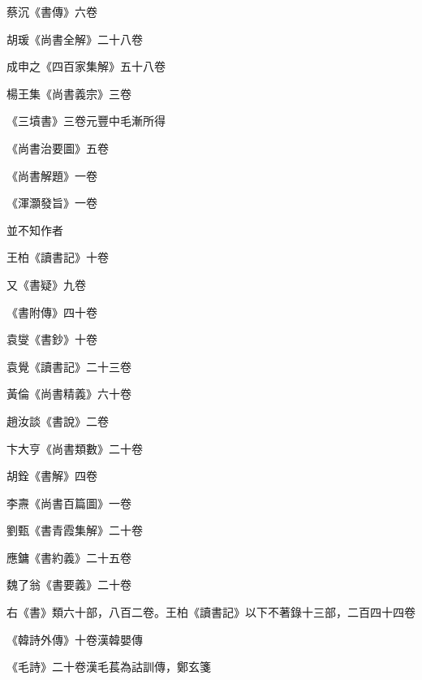 \begin{pinyinscope}
 蔡沉《書傳》六卷



 胡瑗《尚書全解》二十八卷



 成申之《四百家集解》五十八卷



 楊王集《尚書義宗》三卷



 《三墳書》三卷元豐中毛漸所得



 《尚書治要圖》五卷



 《尚書解題》一卷



 《渾灝發旨》一卷



 並不知作者



 王柏《讀書記》十卷



 又《書疑》九卷



 《書附傳》四十卷



 袁燮《書鈔》十卷



 袁覺《讀書記》二十三卷



 黃倫《尚書精義》六十卷



 趙汝談《書說》二卷



 卞大亨《尚書類數》二十卷



 胡銓《書解》四卷



 李燾《尚書百篇圖》一卷



 劉甄《書青霞集解》二十卷



 應鏞《書約義》二十五卷



 魏了翁《書要義》二十卷



 右《書》類六十部，八百二卷。王柏《讀書記》以下不著錄十三部，二百四十四卷



 《韓詩外傳》十卷漢韓嬰傳



 《毛詩》二十卷漢毛萇為詁訓傳，鄭玄箋




\end{pinyinscope}
